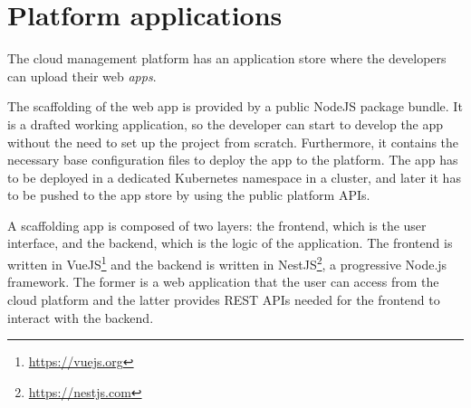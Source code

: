 \section{Platform applications}
\label{sec:platform-applications}

The cloud management platform has an application store where the developers can upload their web \textit{apps}.

The scaffolding of the web app is provided by a public NodeJS package bundle. It is a drafted working application, so the developer can start to develop the app without the need to set up the project from scratch. Furthermore, it contains the necessary base configuration files to deploy the app to the platform. The app has to be deployed in a dedicated Kubernetes namespace in a cluster, and later it has to be pushed to the app store by using the public platform APIs.

A scaffolding app is composed of two layers: the frontend, which is the user interface, and the backend, which is the logic of the application. The frontend is written in VueJS\footnote{\url{https://vuejs.org}} and the backend is written in NestJS\footnote{\url{https://nestjs.com}}, a progressive Node.js framework. The former is a web application that the user can access from the cloud platform and the latter provides REST APIs needed for the frontend to interact with the backend.
